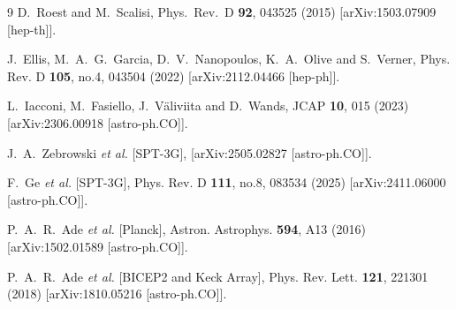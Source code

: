 \documentclass[aps,prev,twocolumn,preprintnumbers,floatfix,nofootinbib]{revtex4-1}
\begin{document}
\begin{thebibliography}{9}
D.~Roest and M.~Scalisi,
  Phys.\ Rev.\ D {\bf 92}, 043525 (2015)
  [arXiv:1503.07909 [hep-th]].

  

J.~Ellis, M.~A.~G.~Garcia, D.~V.~Nanopoulos, K.~A.~Olive and S.~Verner,
Phys. Rev. D \textbf{105}, no.4, 043504 (2022)
[arXiv:2112.04466 [hep-ph]].

L.~Iacconi, M.~Fasiello, J.~V{\"a}liviita and D.~Wands,
JCAP \textbf{10}, 015 (2023)
[arXiv:2306.00918 [astro-ph.CO]].

J.~A.~Zebrowski \textit{et al.} [SPT-3G],
[arXiv:2505.02827 [astro-ph.CO]].

F.~Ge \textit{et al.} [SPT-3G],
Phys. Rev. D \textbf{111}, no.8, 083534 (2025)
[arXiv:2411.06000 [astro-ph.CO]].

P.~A.~R.~Ade \textit{et al.} [Planck],
Astron. Astrophys. \textbf{594}, A13 (2016)
[arXiv:1502.01589 [astro-ph.CO]].

P.~A.~R.~Ade \textit{et al.} [BICEP2 and Keck Array],
Phys. Rev. Lett. \textbf{121}, 221301 (2018)
[arXiv:1810.05216 [astro-ph.CO]].






\end{thebibliography}
\end{document}
